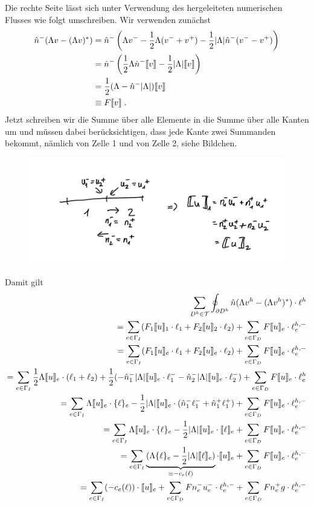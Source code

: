 Die rechte Seite lässt sich unter Verwendung des hergeleiteten numerischen Flusses wie folgt umschreiben. Wir verwenden zunächst
\begin{align*}
  \hat{n}^- (\Lambda v -(\Lambda v)^*) &= \hat{n}^- \left( \Lambda v^- - \frac{1}{2}\Lambda(v^- + v^+) - \frac{1}{2}|\Lambda|\hat{n}^-(v^- - v^+) \right) \\
    &= \hat{n}^- \left(\frac{1}{2}\Lambda \hat{n}^-\llbracket v \rrbracket - \frac{1}{2}|\Lambda|\llbracket v \rrbracket \right) \\
    &= \frac{1}{2}(\Lambda - \hat{n}^- |\Lambda|)\llbracket v \rrbracket \\
    &\equiv F\llbracket v \rrbracket \; .
\end{align*}
Jetzt schreiben wir die Summe über alle Elemente in die Summe über alle Kanten um und müssen dabei berücksichtigen, dass jede Kante zwei Summanden bekommt, nämlich von Zelle 1 und von Zelle 2, siehe Bildchen.
\begin{figure}[hbt]
\centering
\includegraphics[width=.5\textwidth]{plots/skizze_edge.pdf}
\end{figure}
Damit gilt
\begin{align*}
  \sum_{D^k\in\mathcal{T}}\oint_{\partial D^k}  \hat{n} (\Lambda v^h -(\Lambda v^h)^*)\cdot\ell^h \\
  = \sum_{e\in\Gamma_I}  (F_1\llbracket u \rrbracket_1\cdot\ell_1 + F_2\llbracket u \rrbracket_2\cdot\ell_2)  + \sum_{e\in\Gamma_D}  F\llbracket u \rrbracket_e\cdot\ell^{h,-}_e \\
  = \sum_{e\in\Gamma_I}  (F_1\llbracket u \rrbracket_e\cdot\ell_1 + F_2\llbracket u \rrbracket_e\cdot\ell_2)  + \sum_{e\in\Gamma_D}  F\llbracket u \rrbracket_e\cdot\ell^{h,-}_e \\
  = \sum_{e\in\Gamma_I}  \frac{1}{2}\Lambda  \llbracket u \rrbracket_e \cdot(\ell_1 + \ell_2) +  \frac{1}{2}(- \hat{n}_1^- |\Lambda|\llbracket u \rrbracket_e \cdot\ell_1^- - \hat{n}_2^- |\Lambda|\llbracket u \rrbracket_e \cdot\ell_2^- ) + \sum_{e\in\Gamma_D}  F\llbracket u \rrbracket_e\cdot\ell^h_e \\
  =\sum_{e\in\Gamma_I}  \Lambda  \llbracket u \rrbracket_e \cdot\{ \ell \}_e  - \frac{1}{2}|\Lambda|\llbracket u \rrbracket_e \cdot( \hat{n}_1^- \ell_1^- + \hat{n}_1^+  \ell_1^+)  + \sum_{e\in\Gamma_D}  F\llbracket u \rrbracket_e\cdot\ell^{h,-}_e \\
  =\sum_{e\in\Gamma_I}  \Lambda  \llbracket u \rrbracket_e \cdot\{ \ell \}_e  - \frac{1}{2}|\Lambda| \llbracket u \rrbracket_e \cdot \llbracket \ell \rrbracket_e  + \sum_{e\in\Gamma_D}  F\llbracket u \rrbracket_e\cdot\ell^{h,-}_e \\
  =\sum_{e\in\Gamma_I}  \underbrace{(\Lambda  \{ \ell \}_e  - \frac{1}{2}|\Lambda| \llbracket \ell \rrbracket_e)}_{\equiv -c_e(\ell)} \cdot \llbracket u \rrbracket_e  + \sum_{e\in\Gamma_D}  F\llbracket u \rrbracket_e\cdot \ell^{h,-}_e \\
  =\sum_{e\in\Gamma_I}  (-c_e(\ell)) \cdot \llbracket u \rrbracket_e  + \sum_{e\in\Gamma_D}  F n_e^- u_e^- \cdot \ell^{h,-}_e + \sum_{e\in\Gamma_D} F n_e^+ g\cdot \ell^{h,-}_e
\end{align*}
